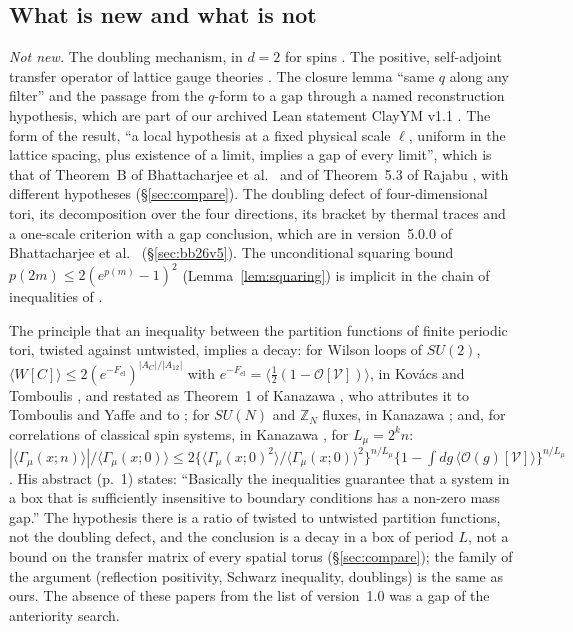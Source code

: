 \documentclass[11pt,a4paper]{article}
\theoremstyle{plain}
\theoremstyle{definition}
\theoremstyle{remark}
\numberwithin{equation}{section}
\begin{document}
\subsection{What is new and what is not}\label{subsec:notnew}
\emph{Not new.} The doubling mechanism, in $d=2$ for spins \cite{OAI26}. The positive, self-adjoint transfer operator of lattice gauge
theories \cite{Lus77,OS78}. The closure lemma ``same $q$ along any filter'' and the passage from the $q$-form to a gap through a named
reconstruction hypothesis, which are part of our archived Lean statement ClayYM v1.1 \cite{ClayYM}. The form of the result, ``a local
hypothesis at a fixed physical scale $\ell$, uniform in the lattice spacing, plus existence of a limit, implies a gap of every limit'',
which is that of Theorem~B of Bhattacharjee et al.\ \cite{BB26} and of Theorem~5.3 of Rajabu \cite{Raj26}, with different hypotheses
(\S\ref{sec:compare}). The doubling defect of four-dimensional tori, its decomposition over the four directions, its bracket by thermal
traces and a one-scale criterion with a gap conclusion, which are in version~5.0.0 of Bhattacharjee et al.\ \cite{BB26v5}
(\S\ref{sec:bb26v5}). The unconditional squaring bound $p(2m)\le2(e^{p(m)}-1)^2$ (Lemma~\ref{lem:squaring}) is implicit in the chain of
inequalities of \cite[proof of Lemma~2.1]{OAI26}.

The principle that an inequality between the partition functions of finite periodic tori, twisted against untwisted, implies a decay: for Wilson loops of $SU(2)$, $\langle W[C]\rangle\le2(e^{-F_{\mathrm{el}}})^{|A_C|/|A_{12}|}$ with $e^{-F_{\mathrm{el}}}=\langle\frac12(1-\mathcal O[\mathcal V])\rangle$, in Kov\'acs and Tomboulis \cite[eqs.~(6) and~(11), pp.~4--5]{KT02}, and restated as Theorem~1 of Kanazawa \cite[p.~5]{Kan}, who attributes it to Tomboulis and Yaffe \cite{TY85} and to \cite{KT02}; for $SU(N)$ and $\mathbb Z_N$ fluxes, in Kanazawa \cite[Theorem~2, p.~7]{Kan}; and, for correlations of classical spin systems, in Kanazawa \cite[Theorem~5, p.~17]{Kan}, for $L_\mu=2^kn$: $|\langle\Gamma_\mu(x;n)\rangle|/\langle\Gamma_\mu(x;0)\rangle\le2\{\langle\Gamma_\mu(x;0)^2\rangle/\langle\Gamma_\mu(x;0)\rangle^2\}^{n/L_\mu}\{1-\int dg\,\langle\mathcal O(g)[\mathcal V]\rangle\}^{n/L_\mu}$. His abstract (p.~1) states: ``Basically the inequalities guarantee that a system in a box that is sufficiently insensitive to boundary conditions has a non-zero mass gap.'' The hypothesis there is a ratio of twisted to untwisted partition functions, not the doubling defect, and the conclusion is a decay in a box of period $L$, not a bound on the transfer matrix of every spatial torus (\S\ref{sec:compare}); the family of the argument (reflection positivity, Schwarz inequality, doublings) is the same as ours. The absence of these papers from the list of version~1.0 was a gap of the anteriority search.
\end{document}
